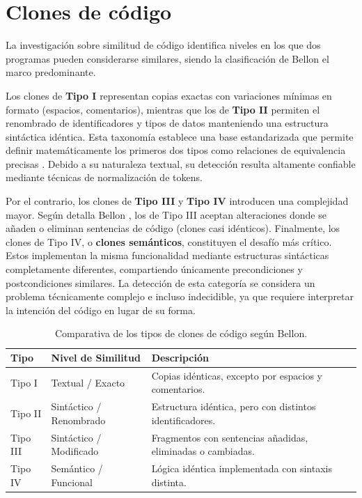\section{Clones de código}

La investigación sobre similitud de código identifica niveles en los que dos programas pueden considerarse similares, siendo la clasificación de Bellon \cite{Bellon2007Comparison} el marco predominante. 

Los clones de \textbf{Tipo I} representan copias exactas con variaciones mínimas en formato (espacios, comentarios), mientras que los de \textbf{Tipo II} permiten el renombrado de identificadores y tipos de datos manteniendo una estructura sintáctica idéntica. Esta taxonomía establece una base estandarizada que permite definir matemáticamente los primeros dos tipos como relaciones de equivalencia precisas \cite{Bellon2007Comparison}. Debido a su naturaleza textual, su detección resulta altamente confiable mediante técnicas de normalización de tokens.

Por el contrario, los clones de \textbf{Tipo III} y \textbf{Tipo IV} introducen una complejidad mayor. Según detalla Bellon \cite{Bellon2007Comparison}, los de Tipo III aceptan alteraciones donde se añaden o eliminan sentencias de código (clones casi idénticos). Finalmente, los clones de Tipo IV, o \textbf{clones semánticos}, constituyen el desafío más crítico. Estos implementan la misma funcionalidad mediante estructuras sintácticas completamente diferentes, compartiendo únicamente precondiciones y postcondiciones similares. La detección de esta categoría se considera un problema técnicamente complejo e incluso indecidible, ya que requiere interpretar la intención del código en lugar de su forma.

\begin{table}[h]
\centering
\caption{Comparativa de los tipos de clones de código según Bellon.}
\label{tab:clones_bellon}
\begin{tabular}{|l|l|l|}
\hline
\textbf{Tipo} & \textbf{Nivel de Similitud} & \textbf{Descripción} \\ \hline
Tipo I & Textual / Exacto & Copias idénticas, excepto por espacios y comentarios. \\ \hline
Tipo II & Sintáctico / Renombrado & Estructura idéntica, pero con distintos identificadores. \\ \hline
Tipo III & Sintáctico / Modificado & Fragmentos con sentencias añadidas, eliminadas o cambiadas. \\ \hline
Tipo IV & Semántico / Funcional & Lógica idéntica implementada con sintaxis distinta. \\ \hline
\end{tabular}
\end{table}

